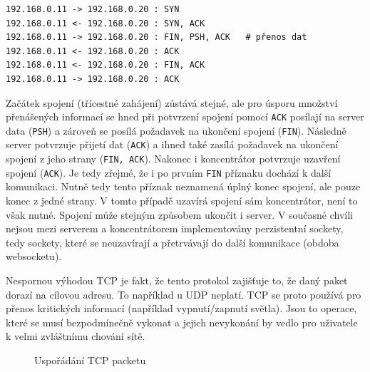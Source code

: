 \begin{verbatim}
192.168.0.11 -> 192.168.0.20 : SYN
192.168.0.11 <- 192.168.0.20 : SYN, ACK
192.168.0.11 -> 192.168.0.20 : FIN, PSH, ACK   # přenos dat
192.168.0.11 <- 192.168.0.20 : ACK
192.168.0.11 <- 192.168.0.20 : FIN, ACK
192.168.0.11 -> 192.168.0.20 : ACK
\end{verbatim}

Začátek spojení (třícestné zahájení) zůstává stejné, ale pro úsporu množ\-ství přenášených informací se hned při potvrzení spojení pomocí \texttt{ACK} posílají na server data (\texttt{PSH}) a zároveň se posílá požadavek na ukončení spojení (\texttt{FIN}). Následně server potvrzuje přijetí dat (\texttt{ACK}) a ihned také zasílá požadavek na ukončení spojení z jeho strany (\texttt{FIN, ACK}). Nakonec i koncentrátor potvrzuje uzavření spojení (\texttt{ACK}). Je tedy zřejmé, že i po prvním \texttt{FIN} příznaku dochází k další komunikaci. Nutně tedy tento příznak neznamená úplný konec spojení, ale pouze konec z jedné strany. V tomto případě uzavírá spojení sám koncentrátor, není to však nutné. Spojení může stejným způsobem ukončit i server. V současné chvíli nejsou mezi serverem a koncentrátorem implementovány perzistentní sockety, tedy sockety, které se neuzavírají a přetrvávají do další komunikace (obdoba websocketu).

Nespornou výhodou TCP je fakt, že tento protokol zajišťuje to, že daný paket dorazí na cílovou adresu. To například u UDP neplatí. TCP se proto používá pro přenos kritických informací (například vypnutí/zapnutí světla). Jsou to operace, které se musí bezpodmínečně vykonat a jejich nevykonání by vedlo pro uživatele k velmi zvláštnímu chování sítě.

\begin{figure}[H]
    \centering
	\caption{Uspořádání TCP packetu}
	\label{fig:tcp-packet}
\end{figure}

